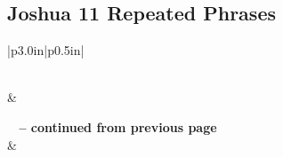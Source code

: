 \subsection{Joshua 11 Repeated Phrases}


\normalsize
 
\begin{center}
\begin{longtable}{|p{3.0in}|p{0.5in}|}
\caption[Joshua 11 Repeated Phrases]{Joshua 11 Repeated Phrases}\label{table:Repeated Phrases Joshua 11} \\
\hline {} &  \\ \hline 
\endfirsthead
 
{{\bfseries \tablename\ \thetable{} -- continued from previous page}} \\  
\hline {} &  \\ \hline 
\endhead
 

\end{longtable}
\end{center}
